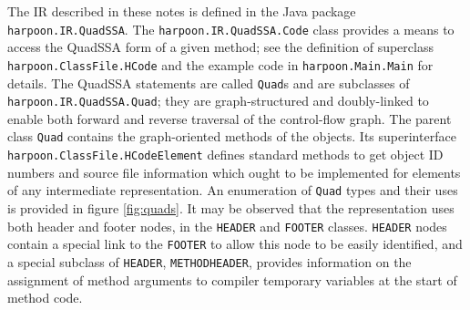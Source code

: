 \documentclass[11pt,notitlepage,twocolumn,twoside]{article}
\begin{document}
The IR described in these notes is defined in the Java package
\texttt{harpoon.IR.QuadSSA}.  The \texttt{harpoon.IR.QuadSSA.Code}
class provides a means to access the QuadSSA form of a given method;
see the definition of superclass \texttt{harpoon.ClassFile.HCode} and
the example code in \texttt{harpoon.Main.Main} for details.  The
QuadSSA statements are called \texttt{Quad}s and are subclasses of
\texttt{harpoon.IR.QuadSSA.Quad}; they are graph-structured and
doubly-linked to enable both forward and reverse traversal of the
control-flow graph.  The parent class \texttt{Quad} contains the
graph-oriented methods of the objects.  Its superinterface
\texttt{harpoon.ClassFile.HCodeElement} defines standard methods to
get object ID numbers and source file information which
ought to be implemented for elements of any intermediate representation.
An enumeration of
\texttt{Quad} types and their uses is provided in figure
\ref{fig:quads}.  It may be observed that the representation uses both
header and footer nodes, in the \texttt{HEADER} and \texttt{FOOTER}
classes.  \texttt{HEADER} nodes contain a special link to the
\texttt{FOOTER} to allow this node to be easily identified, and a
special subclass of \texttt{HEADER}, \texttt{METHODHEADER}, provides
information on the assignment of method arguments to compiler
temporary variables at the start of method code.
\end{document}
